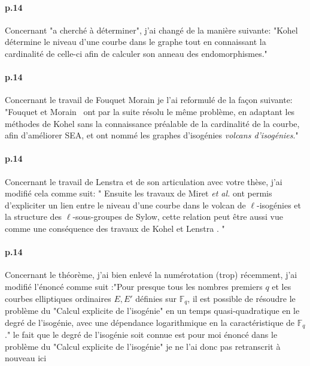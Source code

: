 \documentclass[10pt,a4paper]{article}
\theoremstyle{plain}
\theoremstyle{definition}
\theoremstyle{definition}
\theoremstyle{definition}
\theoremstyle{definition}
\theoremstyle{definition}
\theoremstyle{remark}
\theoremstyle{remark}
\theoremstyle{definition}
\begin{document}
\paragraph{p.14}{Concernant "a cherché à déterminer", j'ai changé de la manière suivante: "Kohel détermine le niveau d'une courbe dans le graphe tout en 
connaissant la cardinalité de celle-ci afin de calculer son anneau des 
endomorphismes."}

\paragraph{p.14}{Concernant le travail de Fouquet Morain je l'ai reformulé de la façon suivante: "Fouquet et Morain~\cite{FouquetMorain02} ont par la suite résolu le même 
problème, en adaptant les méthodes de Kohel sans la connaissance préalable de 
la cardinalité de la courbe, afin d'améliorer SEA, et ont nommé les graphes 
d'isogénies \emph{volcans d'isogénies}."}

\paragraph{p.14}{Concernant le travail de Lenstra et de son articulation avec votre thèse, j'ai modifié cela comme suit: 
"
Ensuite les travaux de Miret \textit{et al.} 
\cite{MiretMRV05}  \cite{MiretMSTV06} 
\cite{MiretMSTV08} ont permis d'expliciter un lien entre le niveau d'une courbe
dans le volcan de $\ell$-isogénies et la structure des $\ell$-sous-groupes de 
Sylow, cette relation peut être aussi vue comme une conséquence des travaux de 
Kohel \cite{Kohel96} et Lenstra \cite{Lenstra96}. 
"}

\paragraph{p.14}{Concernant le théorème, j'ai bien enlevé la numérotation 
(trop) récemment, j'ai modifié l'énoncé comme suit :"Pour presque tous les 
nombres premiers $q$ et les courbes elliptiques ordinaires $E,E'$ définies sur
$\mathbb{F}_q$, il est possible de résoudre le problème du "Calcul explicite de
l'isogénie" en un temps quasi-quadratique en le degré de l'isogénie, 
avec une dépendance logarithmique en la caractéristique de $\mathbb{F}_q$." le 
fait que le degré de l'isogénie soit connue est pour moi énoncé dans le 
problème du "Calcul explicite de l'isogénie" je ne l'ai donc pas retranscrit à 
nouveau ici}
\end{document}
